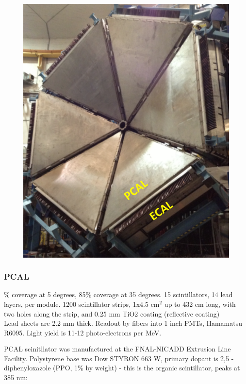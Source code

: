 			 \begin{figure}[H]
    			\centering
    			\includegraphics[width=12cm]{Chapters/Ch2-Experiment/clas-12-system/pics/fd/clas12-pcal-ecal.PNG}
			\end{figure}
			
			
        \subsubsection{PCAL}
                \% coverage at 5 degrees, 85\% coverage at 35 degrees. 15 scintillators, 14 lead layers, per module. 1200 scintillator strips, 1x4.5 cm$^2$ up to 432 cm long, with two holes along the strip, and 0.25 mm TiO2 coating (reflective coating)\\
                Lead sheets are 2.2 mm thick. Readout by fibers into 1 inch PMTs, Hamamatsu R6095. Light yield is 11-12 photo-electrons per MeV. 
                
                PCAL scinitllator was manufactured at the FNAL-NICADD Extrusion Line Facility. Polystyrene base was Dow STYRON 663 W, primary dopant is 2,5 -diphenyloxazole (PPO, 1\% by weight) - this is the organic scintillator, peaks at 385 nm:
                
